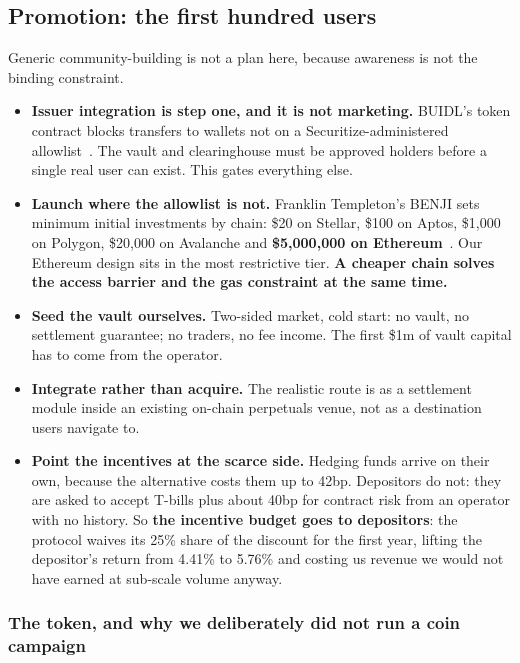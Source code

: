 \documentclass[11pt,a4paper]{article}
\begin{document}
\subsection{Promotion: the first hundred users}\label{sec:promotion}

Generic community-building is not a plan here, because awareness is not the binding constraint.

\begin{itemize}
  \item \textbf{Issuer integration is step one, and it is not marketing.} BUIDL's token contract
  blocks transfers to wallets not on a Securitize-administered
  allowlist~\cite{ecokyc,coinpaprika}. The vault and clearinghouse must be approved holders before a
  single real user can exist. This gates everything else.
  \item \textbf{Launch where the allowlist is not.} Franklin Templeton's BENJI sets minimum initial
  investments by chain: \$20 on Stellar, \$100 on Aptos, \$1,000 on Polygon, \$20,000 on Avalanche and
  \textbf{\$5,000,000 on Ethereum}~\cite{franklin}. Our Ethereum design sits in the most restrictive
  tier. \textbf{A cheaper chain solves the access barrier and the gas constraint at the same time.}
  \item \textbf{Seed the vault ourselves.} Two-sided market, cold start: no vault, no settlement
  guarantee; no traders, no fee income. The first \$1m of vault capital has to come from the operator.
  \item \textbf{Integrate rather than acquire.} The realistic route is as a settlement module inside
  an existing on-chain perpetuals venue, not as a destination users navigate to.
  \item \textbf{Point the incentives at the scarce side.} Hedging funds arrive on their own, because
  the alternative costs them up to 42bp. Depositors do not: they are asked to accept T-bills plus
  about 40bp for contract risk from an operator with no history. So \textbf{the incentive budget goes
  to depositors}: the protocol waives its 25\% share of the discount for the first year, lifting the
  depositor's return from 4.41\% to 5.76\% and costing us revenue we would not have earned at
  sub-scale volume anyway.
\end{itemize}

\subsubsection*{The token, and why we deliberately did not run a coin campaign}
\end{document}
